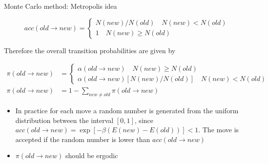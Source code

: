 \documentclass{beamer}
\begin{document}
\begin{frame}{Monte Carlo method: Metropolis idea \cite{frenkel2001understanding}}

\begin{equation*}
acc(old \rightarrow new) = \begin{cases} N(new)/N(old)\quad N(new) < N(old) \\
1 \quad N(new) \geq N(old)  \end{cases}
\end{equation*}
\begin{itemize}
Therefore the overall transition probabilities are given by 
\end{itemize}
\begin{equation*}
\begin{split}
\pi(old \rightarrow new) &= \begin{cases} \alpha(old \rightarrow new)\quad N(new) \geq N(old) \\
\alpha(old \rightarrow new)  \left[  N(new)/N(old) \right] \quad N(new) < N(old) \end{cases} \\
\pi(old \rightarrow new) & = 1-\sum_{new\neq old} \pi(old\rightarrow new)
\end{split}
\end{equation*}
\begin{itemize}
\item In practice for each move a random number is generated from the uniform distribution between the interval $[0,1]$, since $acc(old \rightarrow new) = \exp\left[ -\beta \left( E(new)-E(old) \right)\right] < 1 $. The move is accepted if the random number is lower than $acc(old \rightarrow new)$
\item $\pi(old \rightarrow new)$ should be ergodic
\end{itemize}


\end{frame}
\end{document}
